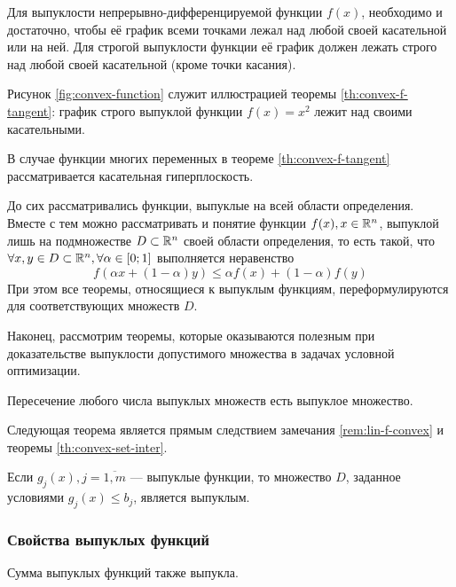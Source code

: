 \begin{thm}
  \label{th:convex-f-tangent}
  Для выпуклости непрерывно-дифференцируемой функции $f(x)$,
  необходимо и достаточно, чтобы её график всеми точками лежал над
  любой своей касательной или на ней. Для строгой выпуклости функции
  её график должен лежать строго над любой своей касательной (кроме
  точки касания).
\end{thm}
Рисунок \ref{fig:convex-function} служит иллюстрацией теоремы
\ref{th:convex-f-tangent}: график строго выпуклой функции $f(x) = x^2$
лежит над своими касательными.

В случае функции многих переменных в теореме \ref{th:convex-f-tangent}
рассматривается касательная гиперплоскость.

\begin{rem}
  До сих рассматривались функции, выпуклые на всей области
  определения. Вместе с тем можно рассматривать и понятие функции
  $f(x), x \in \mathbb{R}^n$, выпуклой лишь на подмножестве $D \subset
  \mathbb{R}^n$ своей области определения, то есть такой, что $\forall x,
  y \in D\subset \mathbb{R}^n, \forall \alpha \in [0;1]$ выполняется
  неравенство
  \begin{equation*}
    f(\alpha x + (1-\alpha)y) \leq \alpha f(x) + (1-\alpha) f(y)
  \end{equation*}
  При этом все теоремы, относящиеся к выпуклым функциям,
  переформулируются для соответствующих множеств $D$.
\end{rem}

Наконец, рассмотрим теоремы, которые оказываются полезным при
доказательстве выпуклости допустимого множества в задачах условной
оптимизации.
\begin{thm}
  \label{th:convex-set-inter}
  Пересечение любого числа выпуклых множеств есть выпуклое множество.
\end{thm}
Следующая теорема является прямым следствием замечания
\ref{rem:lin-f-convex} и теоремы \ref{th:convex-set-inter}.
\begin{thm}
  \label{th:convex-set}
  Если $g_j(x), j=\overline{1,m}$ — выпуклые функции, то множество
  $D$, заданное условиями $g_j(x) \leq b_j$, является выпуклым.
\end{thm}

\subsubsection{Свойства выпуклых функций}
\begin{thm}
  \label{th:convex-f-sum}
  Сумма выпуклых функций также выпукла.
\end{thm}

